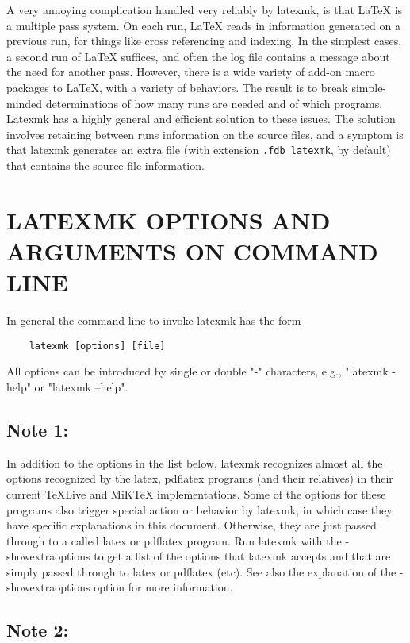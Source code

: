 A  very annoying complication handled very reliably by latexmk, is that LaTeX
is a multiple pass system.  On each run, LaTeX reads in  information
generated on a previous run, for things like cross referencing and indexing.
In the simplest cases, a second run of LaTeX  suffices,  and often  the log
file contains a message about the need for another pass.  However, there is a
wide variety of add-on  macro  packages  to  LaTeX, with  a variety of
behaviors.  The result is to break simple-minded determinations of how many
runs are needed and of  which  programs.   Latexmk has a highly general and
efficient solution to these issues.  The solution involves retaining between
runs  information  on  the  source files,  and a symptom is that latexmk
generates an extra file (with extension \verb|.fdb_latexmk|, by default) that
contains the source file  information.

\section{LATEXMK OPTIONS AND ARGUMENTS ON COMMAND LINE}

In general the command line to invoke latexmk has the form

\begin{verbatim}
	latexmk [options] [file]
\end{verbatim}

All options can be introduced by single or double "-" characters, e.g.,
"latexmk -help" or "latexmk --help".

\subsection{Note 1:}

In addition to the options in the list  below,  latexmk  recognizes almost
all the options recognized by the latex, pdflatex programs (and their
relatives) in their current TeXLive and  MiKTeX  implementations.  Some of
the options for these programs also trigger special action or behavior by
latexmk, in which case they have specific  explanations  in  this document.
Otherwise, they are just passed through to a called latex or pdflatex program.
Run latexmk  with  the  -showextraoptions  to  get  a list of the options
that latexmk accepts and that are simply passed through to latex or pdflatex
(etc).  See also the  explanation of the -showextraoptions option for more
information.

\subsection{Note  2:}

